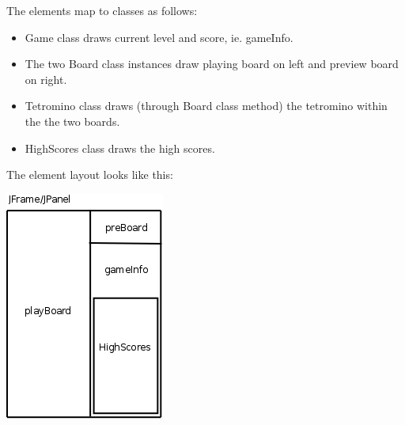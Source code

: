 \documentclass[11pt,a4paper]{article}
\begin{document}
The elements map to classes as follows: 
\begin{itemize}
  \item Game class draws current level and score, ie. gameInfo.
  \item The two Board class instances draw playing board on left and preview board on right.
  \item Tetromino class draws (through Board class method) the tetromino within the the two boards.
  \item HighScores class draws the high scores.
\end{itemize}

\vspace{3mm}
The element layout looks like this:
\begin{center}
  \includegraphics[scale=0.5]{uielements.png}
\end{center}
\end{document}
